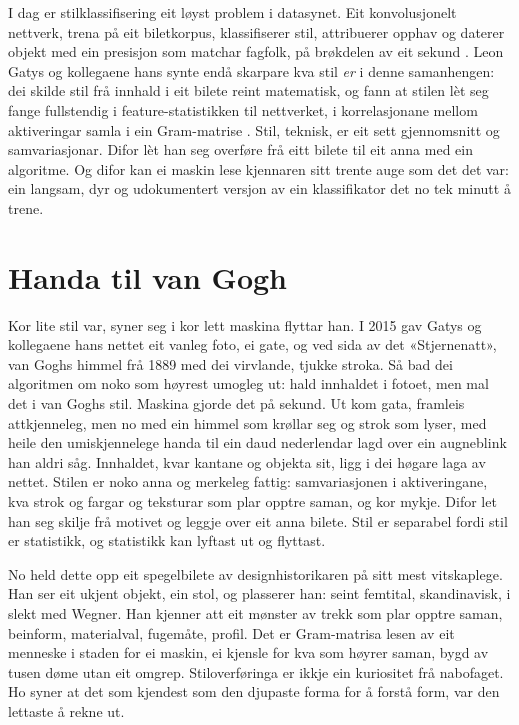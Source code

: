 I dag er stilklassifisering eit løyst problem i datasynet. Eit konvolusjonelt nettverk, trena på eit biletkorpus, klassifiserer stil, attribuerer opphav og daterer objekt med ein presisjon som matchar fagfolk, på brøkdelen av eit sekund \autocite{saleh2016classification}. Leon Gatys og kollegaene hans synte endå skarpare kva stil \emph{er} i denne samanhengen: dei skilde stil frå innhald i eit bilete reint matematisk, og fann at stilen lèt seg fange fullstendig i feature-statistikken til nettverket, i korrelasjonane mellom aktiveringar samla i ein Gram-matrise \autocite{gatys2016style}. Stil, teknisk, er eit sett gjennomsnitt og samvariasjonar. Difor lèt han seg overføre frå eitt bilete til eit anna med ein algoritme. Og difor kan ei maskin lese kjennaren sitt trente auge som det det var: ein langsam, dyr og udokumentert versjon av ein klassifikator det no tek minutt å trene.

\section{Handa til van Gogh}

Kor lite stil var, syner seg i kor lett maskina flyttar han. I 2015 gav Gatys og kollegaene hans nettet eit vanleg foto, ei gate, og ved sida av det «Stjernenatt», van Goghs himmel frå 1889 med dei virvlande, tjukke stroka. Så bad dei algoritmen om noko som høyrest umogleg ut: hald innhaldet i fotoet, men mal det i van Goghs stil. Maskina gjorde det på sekund. Ut kom gata, framleis attkjenneleg, men no med ein himmel som krøllar seg og strok som lyser, med heile den umiskjennelege handa til ein daud nederlendar lagd over ein augneblink han aldri såg. Innhaldet, kvar kantane og objekta sit, ligg i dei høgare laga av nettet. Stilen er noko anna og merkeleg fattig: samvariasjonen i aktiveringane, kva strok og fargar og teksturar som plar opptre saman, og kor mykje. Difor let han seg skilje frå motivet og leggje over eit anna bilete. Stil er separabel fordi stil er statistikk, og statistikk kan lyftast ut og flyttast.

No held dette opp eit spegelbilete av designhistorikaren på sitt mest vitskaplege. Han ser eit ukjent objekt, ein stol, og plasserer han: seint femtital, skandinavisk, i slekt med Wegner. Han kjenner att eit mønster av trekk som plar opptre saman, beinform, materialval, fugemåte, profil. Det er Gram-matrisa lesen av eit menneske i staden for ei maskin, ei kjensle for kva som høyrer saman, bygd av tusen døme utan eit omgrep. Stiloverføringa er ikkje ein kuriositet frå nabofaget. Ho syner at det som kjendest som den djupaste forma for å forstå form, var den lettaste å rekne ut.

